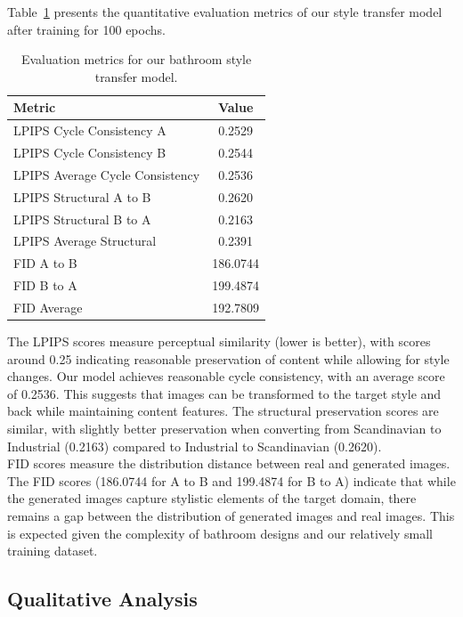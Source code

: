 \documentclass[twocolumn,superscriptaddress,aps]{revtex4-1}
\begin{document}
Table~\ref{tab:metrics} presents the quantitative evaluation metrics of our style transfer model after training for 100 epochs.

\begin{table}[h]
\centering
\begin{tabular}{lc}
\hline
\textbf{Metric} & \textbf{Value} \\
\hline
LPIPS Cycle Consistency A & 0.2529 \\
LPIPS Cycle Consistency B & 0.2544 \\
LPIPS Average Cycle Consistency & 0.2536 \\
LPIPS Structural A to B & 0.2620 \\
LPIPS Structural B to A & 0.2163 \\
LPIPS Average Structural & 0.2391 \\
FID A to B & 186.0744 \\
FID B to A & 199.4874 \\
FID Average & 192.7809 \\
\hline
\end{tabular}
\caption{Evaluation metrics for our bathroom style transfer model.}
\label{tab:metrics}
\end{table}

The LPIPS scores measure perceptual similarity (lower is better), with scores around 0.25 indicating reasonable preservation of content while allowing for style changes. Our model achieves reasonable cycle consistency, with an average score of 0.2536. This suggests that images can be transformed to the target style and back while maintaining content features. The structural preservation scores are similar, with slightly better preservation when converting from Scandinavian to Industrial (0.2163) compared to Industrial to Scandinavian (0.2620). \\

FID scores measure the distribution distance between real and generated images. The FID scores (186.0744 for A to B and 199.4874 for B to A) indicate that while the generated images capture stylistic elements of the target domain, there remains a gap between the distribution of generated images and real images. This is expected given the complexity of bathroom designs and our relatively small training dataset.

\subsection{Qualitative Analysis}
\end{document}
